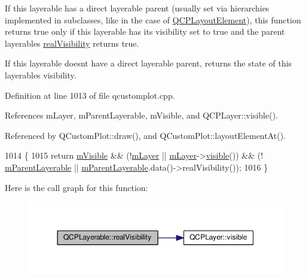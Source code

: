 If this layerable has a direct layerable parent (usually set via hierarchies implemented in subclasses, like in the case of \hyperlink{class_q_c_p_layout_element}{Q\+C\+P\+Layout\+Element}), this function returns true only if this layerable has its visibility set to true and the parent layerable\textquotesingle{}s \hyperlink{class_q_c_p_layerable_a30809f7455e9794bca7b6c737622fa63}{real\+Visibility} returns true.

If this layerable doesn\textquotesingle{}t have a direct layerable parent, returns the state of this layerable\textquotesingle{}s visibility. 

Definition at line 1013 of file qcustomplot.\+cpp.



References m\+Layer, m\+Parent\+Layerable, m\+Visible, and Q\+C\+P\+Layer\+::visible().



Referenced by Q\+Custom\+Plot\+::draw(), and Q\+Custom\+Plot\+::layout\+Element\+At().


\begin{DoxyCode}
1014 \{
1015   \textcolor{keywordflow}{return} \hyperlink{class_q_c_p_layerable_a62e3aed8427d6ce3ccf716f285106cb3}{mVisible} && (!\hyperlink{class_q_c_p_layerable_aa38ec5891aff0f50b36fd63e9372a0cd}{mLayer} || \hyperlink{class_q_c_p_layerable_aa38ec5891aff0f50b36fd63e9372a0cd}{mLayer}->\hyperlink{class_q_c_p_layer_a9efca636e4dcad721999a6282f296016}{visible}()) && (!
      \hyperlink{class_q_c_p_layerable_a3291445a980053e2d17a21d15957624e}{mParentLayerable} || \hyperlink{class_q_c_p_layerable_a3291445a980053e2d17a21d15957624e}{mParentLayerable}.data()->realVisibility());
1016 \}
\end{DoxyCode}


Here is the call graph for this function\+:\nopagebreak
\begin{figure}[H]
\begin{center}
\leavevmode
\includegraphics[width=350pt]{class_q_c_p_layerable_a30809f7455e9794bca7b6c737622fa63_cgraph}
\end{center}
\end{figure}




